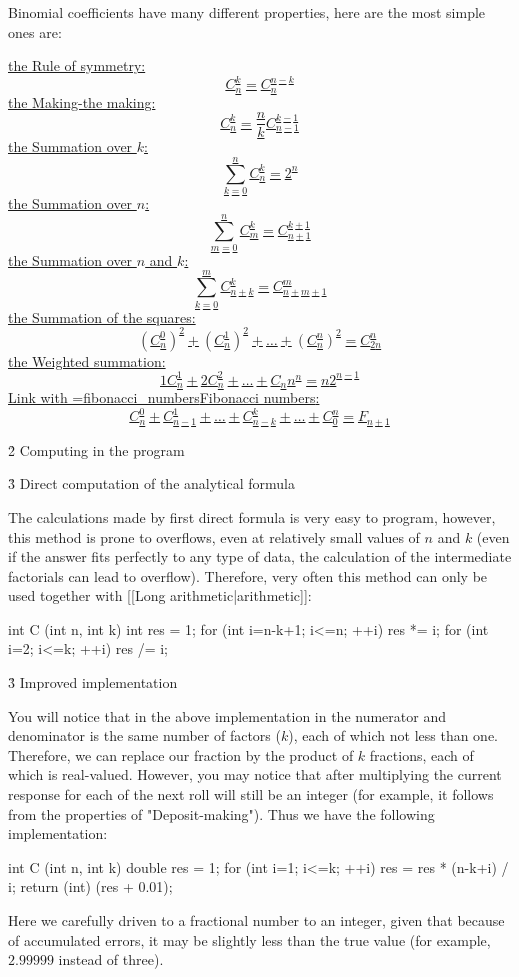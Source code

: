 Binomial coefficients have many different properties, here are the most simple ones are:

\ul{
\li the Rule of symmetry:
$$ C_n^k = C_n^{n-k} $$
\li the Making-the making:
$$ C_n^k = \frac{n}{k} C_{n-1}^{k-1} $$
\li the Summation over $k$:
$$ \sum_{k=0}^n C_n^k = 2^n $$
\li the Summation over $n$:
$$ \sum_{m=0}^n C_m^k = C_{n+1}^{k+1} $$
\li the Summation over $n$ and $k$:
$$ \sum_{k=0}^{m} C_{n+k}^k = C_{n+m+1}^m $$
\li the Summation of the squares:
$$ (C_n^0)^2 + (C_n^1)^2 + \ldots + (C_n^n)^2 = C_{2n}^n $$
\li the Weighted summation:
$$ 1 C_n^1 + 2 C_n^2 + \ldots + C_n n^n = n 2^{n-1} $$
\li Link with \algohref=fibonacci_numbers{Fibonacci numbers}:
$$ C_n^0 + C_{n-1}^1 + \ldots + C_{n-k}^k + \ldots + C_0^n = F_{n+1} $$
}


\h2{ Computing in the program }

\h3{ Direct computation of the analytical formula }

The calculations made by first direct formula is very easy to program, however, this method is prone to overflows, even at relatively small values of $n$ and $k$ (even if the answer fits perfectly to any type of data, the calculation of the intermediate factorials can lead to overflow). Therefore, very often this method can only be used together with [[Long arithmetic|arithmetic]]:

\code

int C (int n, int k) {
int res = 1;
for (int i=n-k+1; i<=n; ++i)
res *= i;
for (int i=2; i<=k; ++i)
res /= i;
}
\endcode

\h3{ Improved implementation }

You will notice that in the above implementation in the numerator and denominator is the same number of factors ($k$), each of which not less than one. Therefore, we can replace our fraction by the product of $k$ fractions, each of which is real-valued. However, you may notice that after multiplying the current response for each of the next roll will still be an integer (for example, it follows from the properties of "Deposit-making"). Thus we have the following implementation:

\code

int C (int n, int k) {
double res = 1;
for (int i=1; i<=k; ++i)
res = res * (n-k+i) / i;
return (int) (res + 0.01);
}
\endcode

Here we carefully driven to a fractional number to an integer, given that because of accumulated errors, it may be slightly less than the true value (for example, $2.99999$ instead of three).

